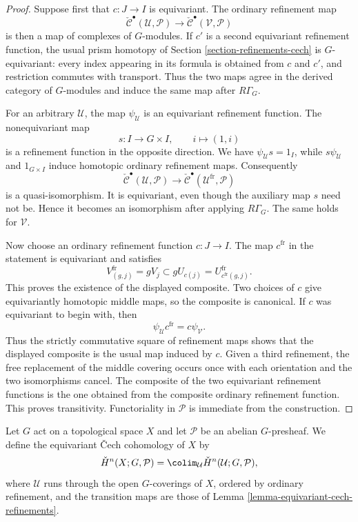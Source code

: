 \begin{proof}
Suppose first that $c:J\to I$ is equivariant. The ordinary refinement
map
$$
\check{\mathcal C}^\bullet(\mathcal U,\mathcal P)
\longrightarrow
\check{\mathcal C}^\bullet(\mathcal V,\mathcal P)
$$
is then a map of complexes of $G$-modules. If $c'$ is a second
equivariant refinement function, the usual prism homotopy of Section
\ref{section-refinements-cech} is $G$-equivariant: every index appearing
in its formula is obtained from $c$ and $c'$, and restriction commutes
with transport. Thus the two maps agree in the derived category of
$G$-modules and induce the same map after $R\Gamma_G$.

For an arbitrary $\mathcal U$, the map $\psi_{\mathcal U}$ is an
equivariant refinement function. The nonequivariant map
$$
s:I\longrightarrow G\times I,
\qquad i\longmapsto(1,i)
$$
is a refinement function in the opposite direction. We have
$\psi_{\mathcal U}s=1_I$, while $s\psi_{\mathcal U}$ and
$1_{G\times I}$ induce homotopic ordinary refinement maps. Consequently
$$
\check{\mathcal C}^\bullet(\mathcal U,\mathcal P)
\longrightarrow
\check{\mathcal C}^\bullet(\mathcal U^{\mathrm{fr}},\mathcal P)
$$
is a quasi-isomorphism. It is equivariant, even though the auxiliary
map $s$ need not be. Hence it becomes an isomorphism after applying
$R\Gamma_G$. The same holds for $\mathcal V$.

Now choose an ordinary refinement function $c:J\to I$. The map
$c^{\mathrm{fr}}$ in the statement is equivariant and satisfies
$$
V^{\mathrm{fr}}_{(g,j)}=gV_j
\subset gU_{c(j)}=U^{\mathrm{fr}}_{c^{\mathrm{fr}}(g,j)}.
$$
This proves the existence of the displayed composite. Two choices of
$c$ give equivariantly homotopic middle maps, so the composite is
canonical. If $c$ was equivariant to begin with, then
$$
\psi_{\mathcal U}c^{\mathrm{fr}}=c\psi_{\mathcal V}.
$$
Thus the strictly commutative square of refinement maps shows that the
displayed composite is the usual map induced by $c$. Given a third
refinement, the free replacement of the middle
covering occurs once with each orientation and the two isomorphisms
cancel. The composite of the two equivariant refinement functions is
the one obtained from the composite ordinary refinement function. This
proves transitivity. Functoriality in $\mathcal P$ is immediate from the
construction.
\end{proof}

\begin{definition}
\label{definition-equivariant-cech-cohomology-space}
\begin{reference}
\cite[Chapter V, \S 5.5, (5.5.13), p. 212]{Tohoku}
\end{reference}
Let $G$ act on a topological space $X$ and let $\mathcal P$ be an
abelian $G$-presheaf. We define the equivariant \v Cech cohomology of
$X$ by
$$
\check H^n(X;G,\mathcal P)
=\colim_{\mathcal U}\check H^n(\mathcal U;G,\mathcal P),
$$
where $\mathcal U$ runs through the open $G$-coverings of $X$, ordered
by ordinary refinement, and the transition maps are those of Lemma
\ref{lemma-equivariant-cech-refinements}.
\end{definition}

